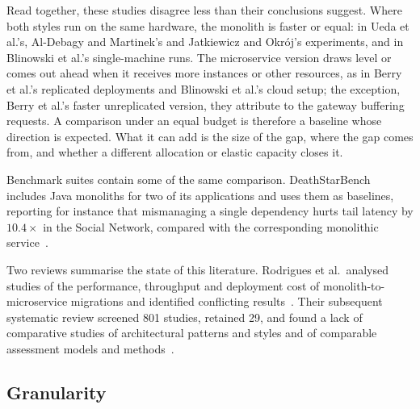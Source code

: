 Read together, these studies disagree less than their conclusions suggest. Where both styles run on the same
hardware, the monolith is faster or equal: in Ueda et al.'s, Al-Debagy and Martinek's and Jatkiewicz and
Okr\'oj's experiments, and in Blinowski et al.'s single-machine runs. The microservice version draws level or comes out ahead when it receives more instances or other resources, as in
Berry et al.'s replicated deployments and Blinowski et al.'s cloud setup; the exception, Berry et al.'s faster
unreplicated version, they attribute to the gateway buffering requests. A comparison under an equal budget is therefore a baseline whose direction is
expected. What it can add is the size of the gap, where the gap comes from, and whether a different allocation
or elastic capacity closes it.

Benchmark suites contain some of the same comparison. DeathStarBench includes Java monoliths for
two of its applications and uses them as baselines, reporting for instance that mismanaging a single dependency
hurts tail latency by $10.4\times$ in the Social Network, compared with the corresponding monolithic
service~\cite{Gan2019}.

Two reviews summarise the state of this literature. Rodrigues et al.\ analysed studies of the
performance, throughput and deployment cost of monolith-to-microservice migrations and identified
conflicting results~\cite{Rodrigues2024}. Their subsequent systematic review screened 801 studies,
retained 29, and found a lack of comparative studies of architectural patterns and styles and of
comparable assessment models and methods~\cite{RodriguesJSS2025}.

\subsection{Granularity}
\label{sec:rw-granularity}


